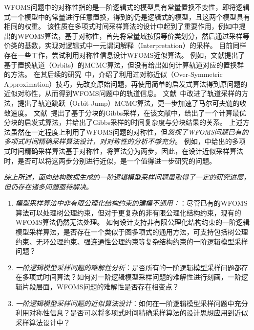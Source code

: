 \documentclass[12pt,UTF8,AutoFakeBold=3,a4paper]{ctexart} %
\begin{document}
WFOMS问题中的对称性指的是一阶逻辑式的模型具有常量置换不变性，即将逻辑式一个模型中的常量进行任意置换，得到的仍是逻辑式的模型，且这两个模型具有相同的权重。
该性质在多项式时间采样算法的设计中起到了重要作用，例如中提出的WFOMS算法，基于对称性，首先将常量域按照等价类划分，然后通过采样等价类的基数，实现对逻辑式中一元谓词解释（Interpretation）的采样。
目前同样存在一些工作，尝试利用对称性信息设计WFOMS近似算法。
例如，文献\cite{niepert_markov_2012}提出了基于置换轨道（Orbits）的MCMC算法，但没有给出如何计算轨道对应的置换群的方法。
在其后续的研究~中，介绍了利用过对称近似（Over-Symmetric Approximation）技巧，先改变原始问题，再使用简单的启发式算法得到原问题的近似对称性，从而得到WFOMS问题中的轨道信息。
文献~\cite{holtzen2020generating}中改进了轨道采样的方法，提出了轨道跳跃（Orbit-Jump）MCMC算法，更一步加速了马尔可夫链的收敛速度。
文献~\cite{DBLP:conf/nips/VenugopalG12}提出了基于分块的Gibbs采样，在该文献中，给出了一个计算最优分块的启发式算法，并给出了Gibbs采样的时间复杂度与分块结果的关系。
上述方法虽然在一定程度上利用了WFOMS问题的对称性，但\emph{忽视了WFOMS问题已有的多项式时间精确采样算法设计，对对称性的分析不够充分}。
例如，中给出的多项式时间精确采样算法基于对称性，将算法分为两步，因此，在设计近似采样算法时，是否可以将这两步分别进行近似，是一个值得进一步研究的问题。

\emph{综上所述，面向结构数据生成的一阶逻辑模型采样问题虽取得了一定的研究进展，但仍存在诸多问题亟待解决。}
\begin{enumerate}
  \item \emph{模型采样算法中非有限公理化结构约束的建模不通用：}：尽管已有的WFOMS算法可以处理树公理约束，但对于更复杂的非有限公理化结构约束，现有的WFOMS算法仍然无法处理。
  如何设计支持非有限公理化结构约束的一阶逻辑模型采样算法，是否存在一个类似于图多项式的通用方法，可支持包括树公理约束、无环公理约束、强连通性公理约束等复杂结构约束的一阶逻辑模型采样问题？
  \item \emph{一阶逻辑模型采样问题的难解性分析}：是否所有的一阶逻辑模型采样问题都存在多项式时间算法？如何对一阶逻辑模型采样问题的难解性进行刻画，一阶逻辑片段层面，WFOMS问题的难解性是否存在相变点？
  \item \emph{一阶逻辑模型采样问题的近似算法设计}：如何在一阶逻辑模型采样问题中充分利用对称性信息？是否可以将多项式时间精确采样算法的设计思想应用到近似采样算法设计中？
\end{enumerate}

% 
\end{document}
